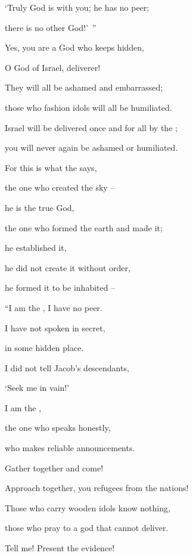 {\par }{\Q ‘Truly
God
is with you; he has no
peer;
\par }{\Q there is no other God!’ ”
\par }{\Q {}Yes,
you
are a God
who keeps hidden,
\par }{\Q O God
of Israel,
deliverer!
\par }{\Q {}They will all be ashamed
and
embarrassed;
\par }{\Q those who fashion
idols
will all
be humiliated.
\par }{\Q {}Israel
will be delivered
once and for all
by the
{};

\par }{\Q you will never again
be ashamed
or
humiliated.
\par }{\Q {}For
this is what
the {}
says,
\par }{\Q the one who created
the sky
–
\par }{\Q he is the true God,
\par }{\Q the one who formed
the earth
and made
it;
\par }{\Q he established
it,
\par }{\Q he did not
create
it without order,
\par }{\Q he formed
it to be inhabited
–
\par }{\Q “I am
the {}, I have no
peer.
\par }{\Q {}I have not
spoken
in secret,
\par }{\Q in some hidden
place.
\par }{\Q I did not
tell
Jacob’s
descendants,
\par }{\Q ‘Seek
me in vain!’

\par }{\Q I am
the {},
\par }{\Q the one who speaks
honestly,
\par }{\Q who makes reliable announcements.
\par }{\Q {}Gather
together and come!
\par }{\Q Approach
together,
you refugees
from the nations!
\par }{\Q Those who carry
wooden
idols
know
nothing,
\par }{\Q those who pray
to
a god
that cannot
deliver.
\par }{\Q {}Tell
me! Present the evidence!

}
